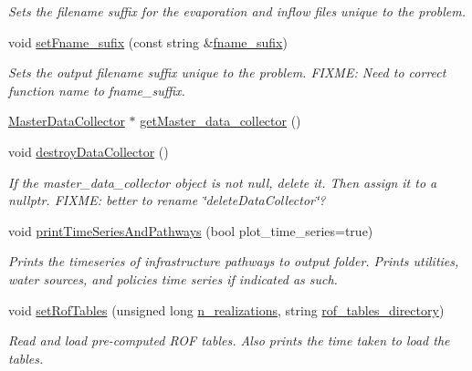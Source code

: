 \begin{DoxyCompactItemize}
\begin{DoxyCompactList}\small\item\em Sets the filename suffix for the evaporation and inflow files unique to the problem. \end{DoxyCompactList}\item 
void \mbox{\hyperlink{classProblem_ad666ae2c231f49103593a7e03a3b58fd}{set\+Fname\+\_\+sufix}} (const string \&\mbox{\hyperlink{classProblem_a59444139a907aaf4c6159caed46c8118}{fname\+\_\+sufix}})
\begin{DoxyCompactList}\small\item\em Sets the output filename suffix unique to the problem. F\+I\+X\+ME\+: Need to correct function name to fname\+\_\+suffix. \end{DoxyCompactList}\item 
\mbox{\hyperlink{classMasterDataCollector}{Master\+Data\+Collector}} $\ast$ \mbox{\hyperlink{classProblem_acf10e6a4a54da1aabea1fa8611e598dc}{get\+Master\+\_\+data\+\_\+collector}} ()
\item 
void \mbox{\hyperlink{classProblem_af87d1081eb2a8fa57fa7f2666292fee3}{destroy\+Data\+Collector}} ()
\begin{DoxyCompactList}\small\item\em If the master\+\_\+data\+\_\+collector object is not null, delete it. Then assign it to a nullptr. F\+I\+X\+ME\+: better to rename \char`\"{}delete\+Data\+Collector\char`\"{}? \end{DoxyCompactList}\item 
void \mbox{\hyperlink{classProblem_a9085e0730845262a8a7b9dc26f5f84a1}{print\+Time\+Series\+And\+Pathways}} (bool plot\+\_\+time\+\_\+series=true)
\begin{DoxyCompactList}\small\item\em Prints the timeseries of infrastructure pathways to output folder. Prints utilities, water sources, and policies\textquotesingle{} time series if indicated as such. \end{DoxyCompactList}\item 
void \mbox{\hyperlink{classProblem_aa9debdf28260fd9054f7d6d2ee516f94}{set\+Rof\+Tables}} (unsigned long \mbox{\hyperlink{classProblem_a270a5672643bfe09e52e0f24e1884136}{n\+\_\+realizations}}, string \mbox{\hyperlink{classProblem_abc641b49a4defb0dbabafbf3f9dbca6e}{rof\+\_\+tables\+\_\+directory}})
\begin{DoxyCompactList}\small\item\em Read and load pre-\/computed R\+OF tables. Also prints the time taken to load the tables. \end{DoxyCompactList}\item 

\end{DoxyCompactItemize}
